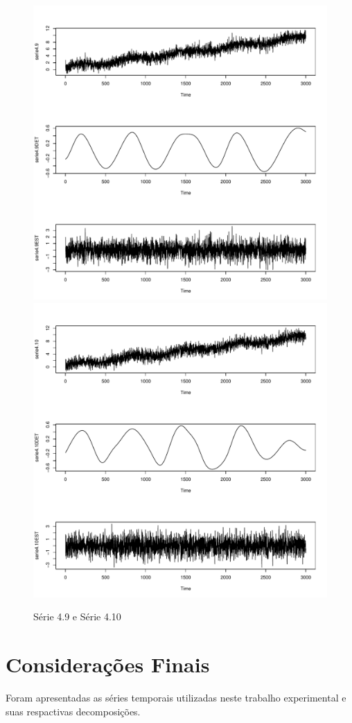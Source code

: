 \graphicspath{{imagens/}}
\begin{figure}[H]
\begin{center}
  \includegraphics[scale=0.43]{serie4_9.pdf} \quad
  \includegraphics[scale=0.43]{serie4_10.pdf}
  \caption{Série 4.9 e Série 4.10}
\end{center}
\end{figure}
\section{Considerações Finais}
Foram apresentadas as séries temporais utilizadas neste trabalho experimental e suas respactivas decomposições.